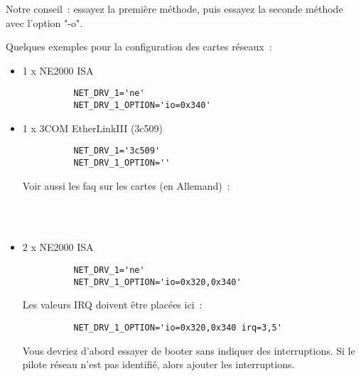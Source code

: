 \begin{description}
{    Notre conseil~: essayez la première méthode, puis essayez la seconde méthode
    avec l'option "-o".

    Quelques exemples pour la configuration des cartes réseaux~:

    \begin{itemize}
    \item 1 x NE2000 ISA
\begin{example}
\begin{verbatim}
          NET_DRV_1='ne'
          NET_DRV_1_OPTION='io=0x340'
\end{verbatim}
\end{example}

    \item 1 x 3COM EtherLinkIII (3c509)
\begin{example}
\begin{verbatim}
          NET_DRV_1='3c509'
          NET_DRV_1_OPTION=''
\end{verbatim}
\end{example}
      Voir aussi les faq sur les cartes (en Allemand)~:

    \begin{raggedright}
      \\
      \\
      \par
    \end{raggedright}

    \item 2 x NE2000 ISA
\begin{example}
\begin{verbatim}
          NET_DRV_1='ne'
          NET_DRV_1_OPTION='io=0x320,0x340'
\end{verbatim}
\end{example}

      Les valeurs IRQ doivent être placées ici~:

\begin{example}
\begin{verbatim}
          NET_DRV_1_OPTION='io=0x320,0x340 irq=3,5'
\end{verbatim}
\end{example}

      Vous devriez d'abord essayer de booter sans indiquer des interruptions.
      Si le pilote réseau n'est pas identifié, alors ajouter les interruptions.


\end{itemize}}
\end{description}
